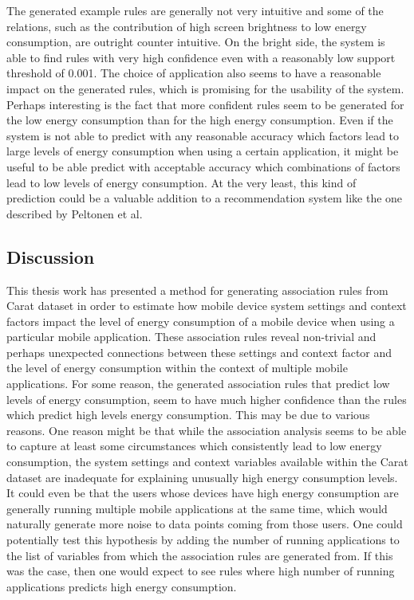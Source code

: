 The generated example rules are generally not very intuitive and some of the relations, such as the contribution of high screen brightness to low energy consumption, are outright counter intuitive. On the bright side, the system is able to find rules with very high confidence even with a reasonably low support threshold of 0.001. The choice of application also seems to have a reasonable impact on the generated rules, which is promising for the usability of the system. Perhaps interesting is the fact that more confident rules seem to be generated for the low energy consumption than for the high energy consumption. Even if the system is not able to predict with any reasonable accuracy which factors lead to large levels of energy consumption when using a certain application, it might be useful to be able predict with acceptable accuracy which combinations of factors lead to low levels of energy consumption. At the very least, this kind of prediction could be a valuable addition to a recommendation system like the one described by Peltonen et al.~\cite{PELTONEN201671}

\FloatBarrier
\subsection{Discussion}

This thesis work has presented a method for generating association rules from Carat dataset in order to estimate how mobile device system settings and context factors impact the level of energy consumption of a mobile device when using a particular mobile application. These association rules reveal non-trivial and perhaps unexpected connections between these settings and context factor and the level of energy consumption within the context of multiple mobile applications. For some reason, the generated association rules that predict low levels of energy consumption, seem to have much higher confidence than the rules which predict high levels energy consumption. This may be due to various reasons. One reason might be that while the association analysis seems to be able to capture at least some circumstances which consistently lead to low energy consumption, the system settings and context variables available within the Carat dataset are inadequate for explaining unusually high energy consumption levels. It could even be that the users whose devices have high energy consumption are generally running multiple mobile applications at the same time, which would naturally generate more noise to data points coming from those users. One could potentially test this hypothesis by adding the number of running applications to the list of variables from which the association rules are generated from. If this was the case, then one would expect to see rules where high number of running applications predicts high energy consumption. 

